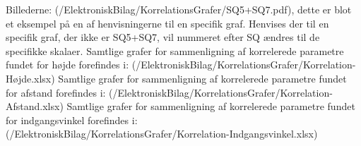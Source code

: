 Billederne: (/ElektroniskBilag/KorrelationsGrafer/SQ5+SQ7.pdf), dette er blot et eksempel på en af henvisningerne til en specifik graf. Henvises der til en specifik graf, der ikke er SQ5+SQ7, vil nummeret efter SQ ændres til de specifikke skalaer.\blankline
%
Samtlige grafer for sammenligning af korrelerede parametre fundet for højde forefindes i: (/ElektroniskBilag/KorrelationsGrafer/Korrelation-Højde.xlsx)\blankline
%
Samtlige grafer for sammenligning af korrelerede parametre fundet for afstand forefindes i: (/ElektroniskBilag/KorrelationsGrafer/Korrelation-Afstand.xlsx)\blankline
%
Samtlige grafer for sammenligning af korrelerede parametre fundet for indgangsvinkel forefindes i: (/ElektroniskBilag/KorrelationsGrafer/Korrelation-Indgangsvinkel.xlsx)

